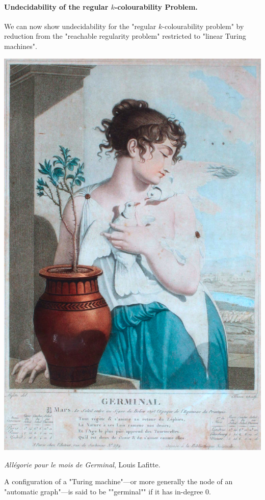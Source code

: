 \paragraph*{Undecidability of the regular $k$-colourability Problem.}
We can now show undecidability for the "regular $k$-colourability problem" by reduction from the "reachable regularity problem" restricted to "linear Turing machines".

\begin{marginfigure}
    \centering
    \includegraphics[width=\linewidth]{fig/germinal.jpg}
    \caption{\emph{Allégorie pour le mois de Germinal}, Louis Lafitte.}
\end{marginfigure}

A configuration of a "Turing machine"---or more generally the node of an
"automatic graph"---is said 
to be \AP""germinal"" if it has in-degree 0.%

